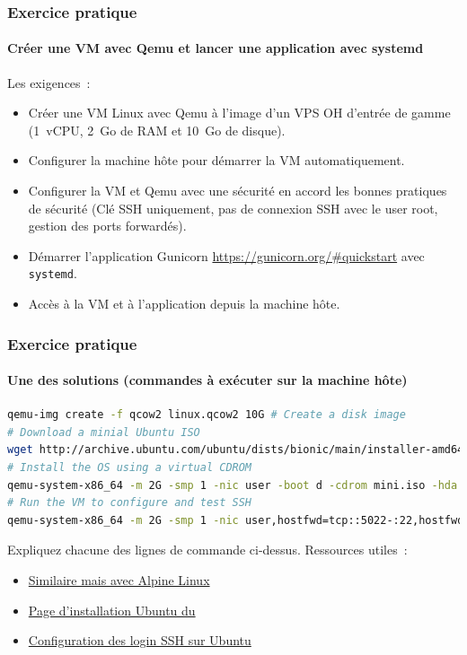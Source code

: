 \documentclass{beamer}
\begin{document}
    \begin{frame}
        \transdissolve
        \frametitle{Exercice pratique \execcounterdispinc{}}
        \framesubtitle{Créer une VM avec Qemu et lancer une application avec systemd}
        Les exigences~:
        \begin{itemize}
            \item Créer une VM Linux avec Qemu à l'image d'un VPS OH d'entrée de gamme (1~vCPU, 2~Go de RAM et 10~Go de disque).
            \item Configurer la machine hôte pour démarrer la VM automatiquement.
            \item Configurer la VM et Qemu avec une sécurité en accord les bonnes pratiques de sécurité (Clé SSH uniquement, pas de connexion SSH avec le user root, gestion des ports forwardés).
            \item Démarrer l'application Gunicorn  \url{https://gunicorn.org/\#quickstart} avec \lstinline{systemd}.
            \item Accès à la VM et à l'application depuis la machine hôte.
        \end{itemize}
    \end{frame}

    \begin{frame}[fragile]
        \transdissolve
        \frametitle{Exercice pratique \execcounterdispinc{}}
        \framesubtitle{Une des solutions (commandes à exécuter sur la machine hôte)}
        \begin{lstlisting}[language=bash]
qemu-img create -f qcow2 linux.qcow2 10G # Create a disk image
# Download a minial Ubuntu ISO
wget http://archive.ubuntu.com/ubuntu/dists/bionic/main/installer-amd64/current/images/netboot/mini.iso
# Install the OS using a virtual CDROM
qemu-system-x86_64 -m 2G -smp 1 -nic user -boot d -cdrom mini.iso -hda linux.qcow2 -k fr -enable-kvm
# Run the VM to configure and test SSH
qemu-system-x86_64 -m 2G -smp 1 -nic user,hostfwd=tcp::5022-:22,hostfwd=tcp::5080-:80 -display none -hda linux.qcow2 -k fr -enable-kvm
        \end{lstlisting}
        Expliquez chacune des lignes de commande ci-dessus.
        \bigbreak
        Ressources utiles~:
        \begin{itemize}
            \item \href{https://wiki.alpinelinux.org/wiki/Install_Alpine_in_QEMU}{Similaire mais avec Alpine Linux}
            \item \href{https://help.ubuntu.com/community/Installation/MinimalCD\#A64-bit_PC_.28amd64.2C_x86_64.29_.28Recommended.29}{Page d'installation Ubuntu du  }
            \item \href{https://phoenixnap.com/kb/generate-setup-ssh-key-ubuntu}{Configuration des login SSH sur Ubuntu}
        \end{itemize}
    \end{frame}
\end{document}
